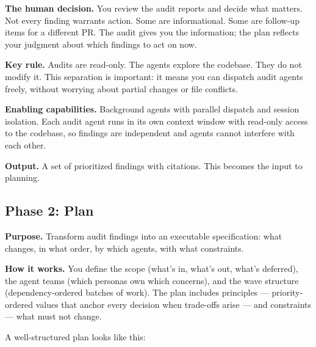 \documentclass[
  a4paper,
  DIV=11,
  numbers=noendperiod]{scrreprt}
\begin{document}
\textbf{The human decision.} You review the audit reports and decide
what matters. Not every finding warrants action. Some are informational.
Some are follow-up items for a different PR. The audit gives you the
information; the plan reflects your judgment about which findings to act
on now.

\textbf{Key rule.} Audits are read-only. The agents explore the
codebase. They do not modify it. This separation is important: it means
you can dispatch audit agents freely, without worrying about partial
changes or file conflicts.

\textbf{Enabling capabilities.} Background agents with parallel dispatch
and session isolation. Each audit agent runs in its own context window
with read-only access to the codebase, so findings are independent and
agents cannot interfere with each other.

\textbf{Output.} A set of prioritized findings with citations. This
becomes the input to planning.

\subsection{Phase 2: Plan}\label{phase-2-plan}

\textbf{Purpose.} Transform audit findings into an executable
specification: what changes, in what order, by which agents, with what
constraints.

\textbf{How it works.} You define the scope (what's in, what's out,
what's deferred), the agent teams (which personas own which concerns),
and the wave structure (dependency-ordered batches of work). The plan
includes principles --- priority-ordered values that anchor every
decision when trade-offs arise --- and constraints --- what must not
change.

A well-structured plan looks like this:
\end{document}
